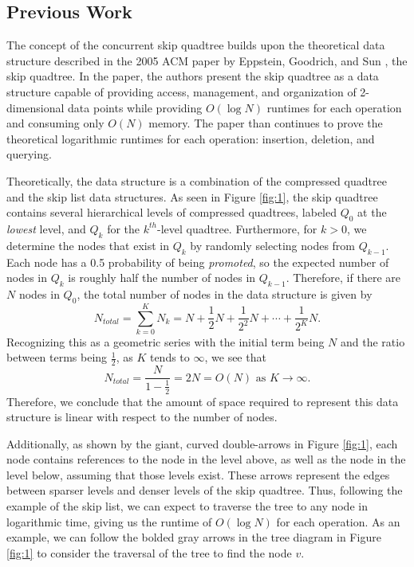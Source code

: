 \documentclass[10pt]{article}
\begin{document}
\subsection{Previous Work}

The concept of the concurrent skip quadtree builds upon the theoretical data structure described in the 2005 ACM paper by Eppstein, Goodrich, and Sun \cite{sqt}, the skip quadtree. In the paper, the authors present the skip quadtree as a data structure capable of providing access, management, and organization of 2-dimensional data points while providing $O(\log N)$ runtimes for each operation and consuming only $O(N)$ memory. The paper than continues to prove the theoretical logarithmic runtimes for each operation: insertion, deletion, and querying.

Theoretically, the data structure is a combination of the compressed quadtree and the skip list data structures. As seen in Figure \ref{fig:1}, the skip quadtree contains several hierarchical levels of compressed quadtrees, labeled $Q_0$ at the \textit{lowest} level, and $Q_k$ for the $k^{th}$-level quadtree. Furthermore, for $k>0$, we determine the nodes that exist in $Q_k$ by randomly selecting nodes from $Q_{k-1}$. Each node has a 0.5 probability of being \textit{promoted}, so the expected number of nodes in $Q_k$ is roughly half the number of nodes in $Q_{k-1}$. Therefore, if there are $N$ nodes in $Q_0$, the total number of nodes in the data structure is given by
$$N_{total}=\sum_{k=0}^{K} N_k=N+\frac{1}{2}N+\frac{1}{2^2}N+\cdots+\frac{1}{2^{K}}N.$$
Recognizing this as a geometric series with the initial term being $N$ and the ratio between terms being $\frac{1}{2}$, as $K$ tends to $\infty$, we see that
$$N_{total}=\frac{N}{1-\frac{1}{2}}=2N=O(N)\text{ as }K\to\infty.$$
Therefore, we conclude that the amount of space required to represent this data structure is linear with respect to the number of nodes.

Additionally, as shown by the giant, curved double-arrows in Figure \ref{fig:1}, each node contains references to the node in the level above, as well as the node in the level below, assuming that those levels exist. These arrows represent the edges between sparser levels and denser levels of the skip quadtree. Thus, following the example of the skip list, we can expect to traverse the tree to any node in logarithmic time, giving us the runtime of $O(\log N)$ for each operation. As an example, we can follow the bolded gray arrows in the tree diagram in Figure \ref{fig:1} to consider the traversal of the tree to find the node $v$.
\end{document}

